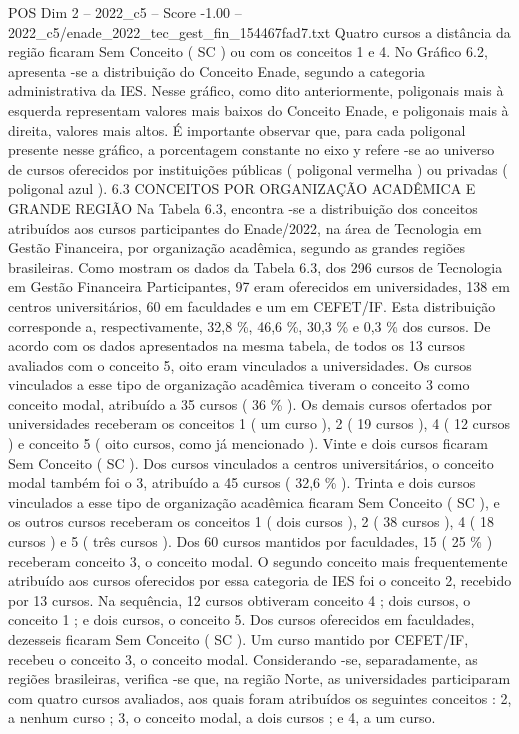 \begin{textsample}{POS Dim 2 – 2022\_c5 – Score -1.00 – 2022\_c5/enade\_2022\_tec\_gest\_fin\_154467fad7.txt}
Quatro cursos a distância da região ficaram Sem Conceito ( SC ) ou com os conceitos 1 e 4.
No Gráfico 6.2, apresenta -se a distribuição do Conceito Enade, segundo a categoria administrativa da IES.
Nesse gráfico, como dito anteriormente, poligonais mais à esquerda representam valores mais baixos do Conceito Enade, e poligonais mais à direita, valores mais altos.
É importante observar que, para cada poligonal presente nesse gráfico, a porcentagem constante no eixo y refere -se ao universo de cursos oferecidos por instituições públicas ( poligonal vermelha ) ou privadas ( poligonal azul ). 6.3 CONCEITOS POR ORGANIZAÇÃO ACADÊMICA E GRANDE REGIÃO Na Tabela 6.3, encontra -se a distribuição dos conceitos atribuídos aos cursos participantes do Enade/2022, na área de Tecnologia em Gestão Financeira, por organização acadêmica, segundo as grandes regiões brasileiras.
Como mostram os dados da Tabela 6.3, dos 296 cursos de Tecnologia em Gestão Financeira Participantes, 97 eram oferecidos em universidades, 138 em centros universitários, 60 em faculdades e um em CEFET/IF.
Esta distribuição corresponde a, respectivamente, 32,8 \%, 46,6 \%, 30,3 \% e 0,3 \% dos cursos.
De acordo com os dados apresentados na mesma tabela, de todos os 13 cursos avaliados com o conceito 5, oito eram vinculados a universidades.
Os cursos vinculados a esse tipo de organização acadêmica tiveram o conceito 3 como conceito modal, atribuído a 35 cursos ( 36 \% ).
Os demais cursos ofertados por universidades receberam os conceitos 1 ( um curso ), 2 ( 19 cursos ), 4 ( 12 cursos ) e conceito 5 ( oito cursos, como já mencionado ).
Vinte e dois cursos ficaram Sem Conceito ( SC ).
Dos cursos vinculados a centros universitários, o conceito modal também foi o 3, atribuído a 45 cursos ( 32,6 \% ).
Trinta e dois cursos vinculados a esse tipo de organização acadêmica ficaram Sem Conceito ( SC ), e os outros cursos receberam os conceitos 1 ( dois cursos ), 2 ( 38 cursos ), 4 ( 18 cursos ) e 5 ( três cursos ).
Dos 60 cursos mantidos por faculdades, 15 ( 25 \% ) receberam conceito 3, o conceito modal.
O segundo conceito mais frequentemente atribuído aos cursos oferecidos por essa categoria de IES foi o conceito 2, recebido por 13 cursos.
Na sequência, 12 cursos obtiveram conceito 4 ; dois cursos, o conceito 1 ; e dois cursos, o conceito 5.
Dos cursos oferecidos em faculdades, dezesseis ficaram Sem Conceito ( SC ).
Um curso mantido por CEFET/IF, recebeu o conceito 3, o conceito modal.
Considerando -se, separadamente, as regiões brasileiras, verifica -se que, na região Norte, as universidades participaram com quatro cursos avaliados, aos quais foram atribuídos os seguintes conceitos : 2, a nenhum curso ; 3, o conceito modal, a dois cursos ; e 4, a um curso.

\end{textsample}
